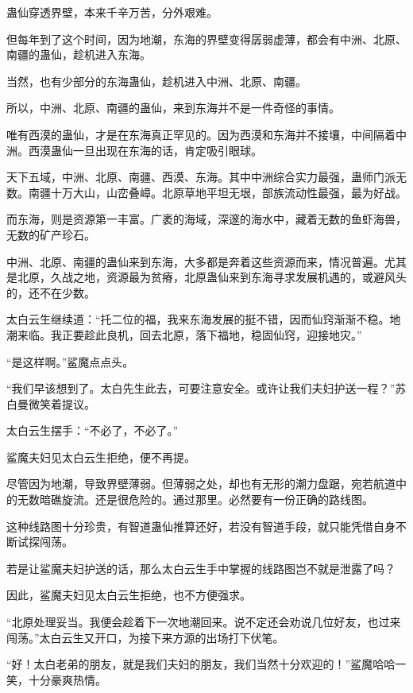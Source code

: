 
\begin{this_body}

蛊仙穿透界壁，本来千辛万苦，分外艰难。

但每年到了这个时间，因为地潮，东海的界壁变得孱弱虚薄，都会有中洲、北原、南疆的蛊仙，趁机进入东海。

当然，也有少部分的东海蛊仙，趁机进入中洲、北原、南疆。

所以，中洲、北原、南疆的蛊仙，来到东海并不是一件奇怪的事情。

唯有西漠的蛊仙，才是在东海真正罕见的。因为西漠和东海并不接壤，中间隔着中洲。西漠蛊仙一旦出现在东海的话，肯定吸引眼球。

天下五域，中洲、北原、南疆、西漠、东海。其中中洲综合实力最强，蛊师门派无数。南疆十万大山，山峦叠嶂。北原草地平坦无垠，部族流动性最强，最为好战。

而东海，则是资源第一丰富。广袤的海域，深邃的海水中，藏着无数的鱼虾海兽，无数的矿产珍石。

中洲、北原、南疆的蛊仙来到东海，大多都是奔着这些资源而来，情况普遍。尤其是北原，久战之地，资源最为贫瘠，北原蛊仙来到东海寻求发展机遇的，或避风头的，还不在少数。

太白云生继续道：“托二位的福，我来东海发展的挺不错，因而仙窍渐渐不稳。地潮来临。我正要趁此良机，回去北原，落下福地，稳固仙窍，迎接地灾。”

“是这样啊。”鲨魔点点头。

“我们早该想到了。太白先生此去，可要注意安全。或许让我们夫妇护送一程？”苏白曼微笑着提议。

太白云生摆手：“不必了，不必了。”

鲨魔夫妇见太白云生拒绝，便不再提。

尽管因为地潮，导致界壁薄弱。但薄弱之处，却也有无形的潮力盘踞，宛若航道中的无数暗礁旋流。还是很危险的。通过那里。必然要有一份正确的路线图。

这种线路图十分珍贵，有智道蛊仙推算还好，若没有智道手段，就只能凭借自身不断试探闯荡。

若是让鲨魔夫妇护送的话，那么太白云生手中掌握的线路图岂不就是泄露了吗？

因此，鲨魔夫妇见太白云生拒绝，也不方便强求。

“北原处理妥当。我便会趁着下一次地潮回来。说不定还会劝说几位好友，也过来闯荡。”太白云生又开口，为接下来方源的出场打下伏笔。

“好！太白老弟的朋友，就是我们夫妇的朋友，我们当然十分欢迎的！”鲨魔哈哈一笑，十分豪爽热情。


\end{this_body}

